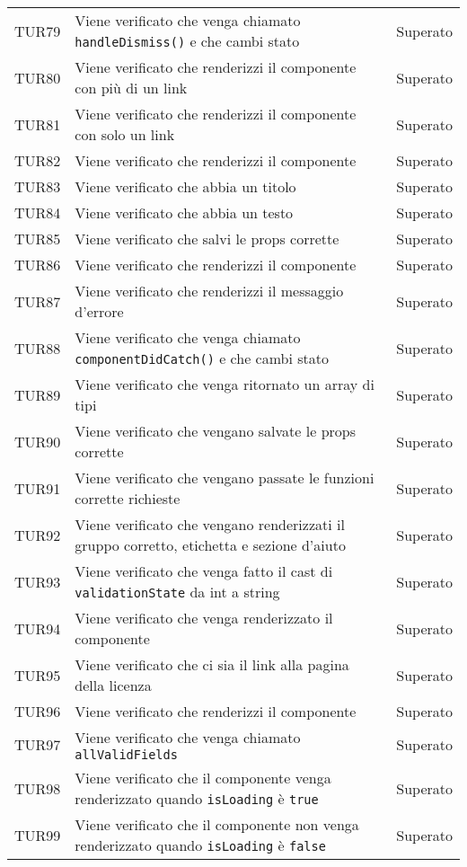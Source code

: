 \documentclass[PianoDiQualifica.tex]{subfiles}
\begin{document}
\begin{longtable}[H]{P{2cm}P{8.5cm}P{3cm}}
	TUR79 & Viene verificato che venga chiamato \texttt{handleDismiss()} e che cambi stato & Superato \\ 
	TUR80 & Viene verificato che renderizzi il componente con più di un link & Superato \\ 
	TUR81 & Viene verificato che renderizzi il componente con solo un link & Superato \\ 
	TUR82 & Viene verificato che renderizzi il componente & Superato \\ 
	TUR83 & Viene verificato che abbia un titolo & Superato \\ 
	TUR84 & Viene verificato che abbia un testo & Superato \\ 
	TUR85 & Viene verificato che salvi le props corrette & Superato \\ 
	TUR86 & Viene verificato che renderizzi il componente & Superato \\ 
	TUR87 & Viene verificato che renderizzi il messaggio d'errore & Superato \\ 
	TUR88 & Viene verificato che venga chiamato \texttt{componentDidCatch()} e che cambi stato & Superato \\ 
	TUR89 & Viene verificato che venga ritornato un array di tipi & Superato \\ 
	TUR90 & Viene verificato che vengano salvate le props corrette & Superato \\ 
	TUR91 & Viene verificato che vengano passate le funzioni corrette richieste & Superato \\ 
	TUR92 & Viene verificato che vengano renderizzati il gruppo corretto, etichetta e sezione d'aiuto & Superato \\ 
	TUR93 & Viene verificato che venga fatto il cast di \texttt{validationState} da int a string & Superato \\ 
	TUR94 & Viene verificato che venga renderizzato il componente & Superato \\ 
	TUR95 & Viene verificato che ci sia il link alla pagina della licenza & Superato \\ 
	TUR96 & Viene verificato che renderizzi il componente & Superato \\ 
	TUR97 & Viene verificato che venga chiamato \texttt{allValidFields} & Superato \\ 
	TUR98 & Viene verificato che il componente venga renderizzato quando \texttt{isLoading} è \texttt{true} & Superato \\ 
	TUR99 & Viene verificato che il componente non venga renderizzato quando \texttt{isLoading} è \texttt{false} & Superato \\ 

\end{longtable}
\end{document}
